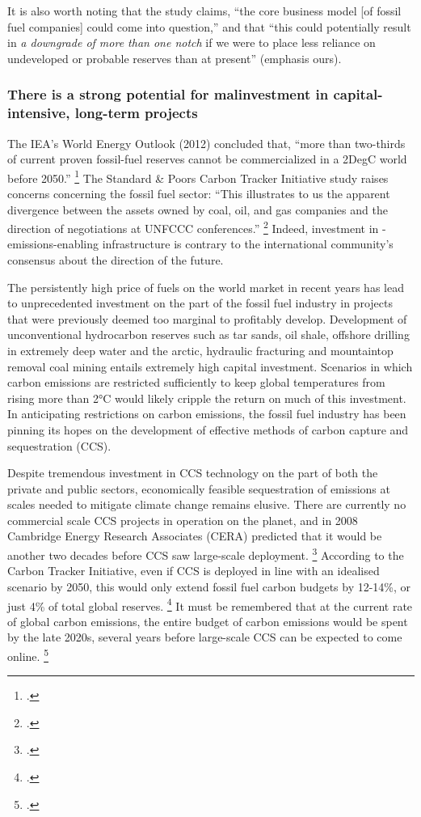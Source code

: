 It is also worth noting that the study claims, ``the core business model [of fossil fuel companies] could come into question,'' and that ``this could potentially result in \emph{a downgrade of more than one notch} if we were to place less reliance on undeveloped or probable reserves than at present'' (emphasis ours).



	\subsubsection {There is a strong potential for malinvestment in capital-intensive, long-term projects}



The IEA's World Energy Outlook (2012) concluded that, ``more than two-thirds of current proven fossil-fuel reserves cannot be commercialized in a 2DegC world before 2050.'' \footcite{IEA2012}
The Standard \& Poors Carbon Tracker Initiative study raises concerns concerning the fossil fuel sector: ``This illustrates to us the apparent divergence between the assets owned by coal, oil, and gas companies and the direction of negotiations at UNFCCC conferences.'' \footcite{SandPConstrained}
Indeed, investment in -emissions-enabling infrastructure is contrary to the international community's consensus about the direction of the future.

The persistently high price of fuels on the world market in recent years has lead to unprecedented investment on the part of the fossil fuel industry in projects that were previously deemed too marginal to profitably develop. 
Development of unconventional hydrocarbon reserves such as tar sands, oil shale, offshore drilling in extremely deep water and the arctic, hydraulic fracturing and mountaintop removal coal mining entails extremely high capital investment. 
Scenarios in which carbon emissions are restricted sufficiently to keep global temperatures from rising more than 2°C would likely cripple the return on much of this investment.
In anticipating restrictions on carbon emissions, the fossil fuel industry has been pinning its hopes on the development of effective methods of carbon capture and sequestration (CCS). 

Despite tremendous investment in CCS technology on the part of both the private and public sectors, economically feasible sequestration of emissions at scales needed to mitigate climate change remains elusive. 
There are currently no commercial scale CCS projects in operation on the planet, and in 2008 Cambridge Energy Research Associates (CERA) predicted that it would be another two decades before CCS saw large-scale deployment. \footcite{CERACrossing}
According to the Carbon Tracker Initiative, even if CCS is deployed in line with an idealised scenario by 2050, this would only extend fossil fuel carbon budgets by 12-14\%, or just 4\% of total global reserves. \footcite{CTI2013}
It must be remembered that at the current rate of global carbon emissions, the entire budget of carbon emissions would be spent by the late 2020s, several years before large-scale CCS can be expected to come online. \footcite{CTI2012}

